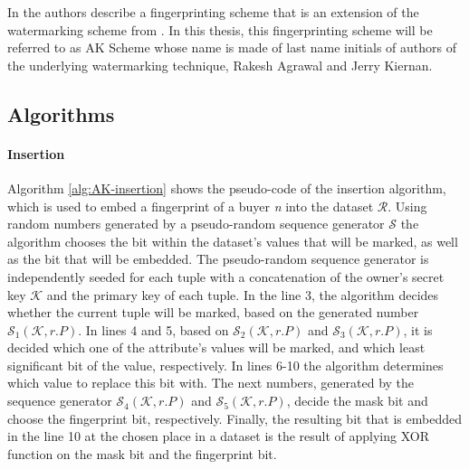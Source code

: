 In \cite{li2005fingerprinting} the authors describe a fingerprinting scheme that is an extension of the watermarking scheme from \cite{agrawal2003watermarking}. 
In this thesis, this fingerprinting scheme will be referred to as AK Scheme whose name is made of last name initials of authors of the underlying watermarking technique, Rakesh Agrawal and Jerry Kiernan.

\subsection{Algorithms}
\paragraph{Insertion}
Algorithm \ref{alg:AK-insertion} shows the pseudo-code of the insertion algorithm, which is used to embed a fingerprint of a buyer \textit{n} into the dataset $\mathcal{R}$. 
Using random numbers generated by a pseudo-random sequence generator $\mathcal{S}$ the algorithm chooses the bit within the dataset's values that will be marked, as well as the bit that will be embedded.
The pseudo-random sequence generator is independently seeded for each tuple with a concatenation of the owner's secret key $\mathcal{K}$ and the primary key of each tuple. 
In the line 3, the algorithm decides whether the current tuple will be marked, based on the generated number $\mathcal{S}_1(\mathcal{K}, r.P)$. 
In lines 4 and 5, based on $\mathcal{S}_2(\mathcal{K}, r.P)$ and $\mathcal{S}_3(\mathcal{K}, r.P)$, it is decided which one of the attribute's values will be marked, and which least significant bit of the value, respectively. 
In lines 6-10 the algorithm determines which value to replace this bit with. 
The next numbers, generated by the sequence generator $\mathcal{S}_4(\mathcal{K}, r.P)$ and $\mathcal{S}_5(\mathcal{K}, r.P)$, decide the mask bit and choose the fingerprint bit, respectively.
Finally, the resulting bit that is embedded in the line 10 at the chosen place in a dataset is the result of applying XOR function on the mask bit and the fingerprint bit.

